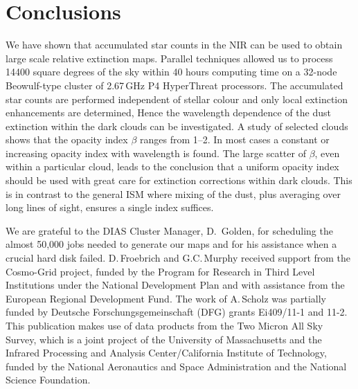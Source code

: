 \documentclass{aa}
\begin{document}
\section{Conclusions}

We have shown that accumulated star counts in the NIR can be used to obtain
large scale relative extinction maps. Parallel techniques allowed us to process
14400 square degrees of the sky within 40 hours computing time on a 32-node 
Beowulf-type cluster of 2.67\,GHz P4 HyperThreat processors. The accumulated
star counts are performed independent of stellar colour and only local
extinction enhancements are determined, Hence the wavelength dependence of the
dust extinction within the dark clouds can be investigated. A study of selected
clouds shows that the opacity index $\beta$ ranges from 1--2. In most cases a
constant or increasing opacity index with wavelength is found. The large
scatter of $\beta$, even within a particular cloud, leads to the conclusion
that a uniform opacity index should be used with great care for extinction
corrections within dark clouds. This is in contrast to the general ISM where
mixing of the dust, plus averaging over long  lines of sight, ensures a single
index suffices.

\begin{acknowledgements}

We are grateful to the DIAS Cluster Manager, D.~Golden, for scheduling  the
almost 50,000 jobs needed to generate our maps and for his assistance  when a
crucial hard disk failed. D.\,Froebrich and G.C.\,Murphy received support from
the Cosmo-Grid project, funded by the Program for Research in Third Level
Institutions under the National Development Plan and with assistance from the
European Regional Development Fund. The work of A.\,Scholz was partially funded
by Deutsche Forschungsgemeinschaft (DFG) grants Ei409/11-1 and 11-2. This
publication makes use of data products from the Two Micron All Sky Survey,
which is a joint project of the University of Massachusetts and the Infrared
Processing and Analysis Center/California Institute of Technology, funded by
the National Aeronautics and Space Administration and the National Science
Foundation.


\end{acknowledgements}
\end{document}
